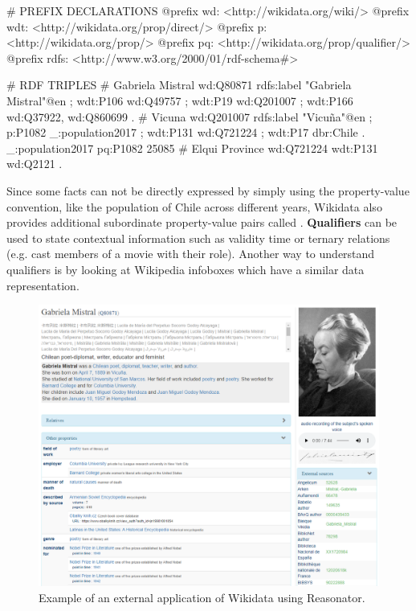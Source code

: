 \begin{sparqlcode}[%
    caption=Set of RDF triples about Gabriela Mistral in Wikidata., 
    label=lst:wikidataRdfExample]
# PREFIX DECLARATIONS
@prefix wd: <http://wikidata.org/wiki/>
@prefix wdt: <http://wikidata.org/prop/direct/>
@prefix p: <http://wikidata.org/prop/>
@prefix pq: <http://wikidata.org/prop/qualifier/>
@prefix rdfs: <http://www.w3.org/2000/01/rdf-schema#>

# RDF TRIPLES
# Gabriela Mistral
wd:Q80871 rdfs:label "Gabriela Mistral"@en ;
    wdt:P106 wd:Q49757 ;
    wdt:P19 wd:Q201007 ;
    wdt:P166 wd:Q37922, wd:Q860699 .
# Vicuna
wd:Q201007 rdfs:label "Vicuña"@en ;
    p:P1082 _:population2017 ;
    wdt:P131 wd:Q721224 ;
    wdt:P17 dbr:Chile .
_:population2017 pq:P1082 25085
# Elqui Province
wd:Q721224 wdt:P131 wd:Q2121 .
\end{sparqlcode}

Since some facts can not be directly expressed by simply using the property-value convention, 
like the population of Chile across different years, Wikidata also provides additional 
subordinate property-value pairs called . \textbf{Qualifiers} can be used 
to state contextual information such as validity time or ternary relations (e.g. cast members of 
a movie with their role). Another way to understand qualifiers is by looking at Wikipedia 
infoboxes which have a similar data representation.

\begin{figure}[!h]
    \centering
    \includegraphics[scale=.5]{imagenes/2_theorical_framework/wikidataReasonatorExample.PNG}
    \caption[Example of an external application of Wikidata using Reasonator.]{Example of an external application of Wikidata using Reasonator\footnotemark.}
    \label{fig:wikidataReasonator}
\end{figure}

